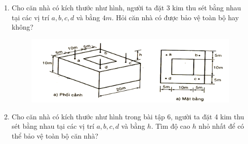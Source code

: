 \documentclass[12pt,a4paper]{article}
\begin{document}
\begin{enumerate}
        \item Cho căn nhà có kích thước như hình, người ta đặt 3 kim thu sét bằng nhau tại các vị trí $a, b, c, d$ và bằng $4m$. Hỏi căn nhà có được bảo vệ toàn bộ hay không?
            \begin{figure}[htp]
                \begin{center}
                    \includegraphics[scale=.4]{baitap6}
                \end{center}
            \end{figure}

        \item Cho căn nhà có kích thước như hình trong bài tập 6, người ta đặt 4 kim thu sét bằng nhau tại các vị trí $a, b, c, d$ và bằng $h$. Tìm độ cao $h$ nhỏ nhất để có thể bảo vệ toàn bộ căn nhà?            
    \end{enumerate}
\end{document}
